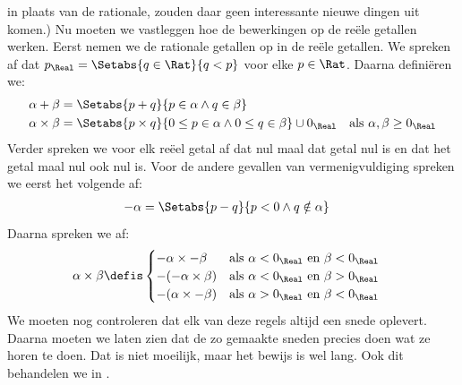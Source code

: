 \documentclass[openany]{memoir}
\begin{document}
in plaats van de rationale, zouden daar geen interessante nieuwe
dingen uit komen.)
Nu moeten we vastleggen hoe de bewerkingen op de reële getallen werken.
Eerst nemen we de rationale getallen op in de reële getallen. We
spreken af dat $p_\Real = \Setabs{q \in \Rat}{q < p}$ voor elke
$p \in \Rat$. Daarna definiëren we:
\begin{align*}
	\alpha + \beta &= \Setabs{p + q}{p \in \alpha \land q \in \beta}\\
	\alpha \times \beta &=
	\Setabs{p \times q}{0 \leq p \in \alpha \land 0 \leq q \in \beta} \cup 0_\Real & \text{als }\alpha, \beta \geq 0_\Real
\end{align*}
Verder spreken we voor elk reëel getal af dat nul maal dat getal nul
is en dat het getal maal nul ook nul is. Voor de andere gevallen van
vermenigvuldiging spreken we eerst het volgende af:
\begin{align*}
	-\alpha &= \Setabs{p - q}{p < 0 \land q \notin \alpha}
\end{align*}
Daarna spreken we af:
\begin{align*}
	\alpha \times \beta &\defis
	\begin{cases}
		\mathord{-}\alpha \times \mathord{-}\beta &\text{als }\alpha < 0_\Real\text{ en }\beta < 0_\Real\\
		\mathord{-}(\mathord{-}\alpha \times \beta) &\text{als }\alpha < 0_\Real \text{ en }\beta > 0_\Real\\
		\mathord{-}(\alpha \times \mathord{-}\beta) &\text{als }\alpha > 0_\Real \text{ en }\beta < 0_\Real
	\end{cases}
\end{align*}
We moeten nog controleren dat elk van deze regels altijd een snede
oplevert. Daarna moeten we laten zien dat de zo gemaakte sneden precies
doen wat ze horen te doen. Dat is niet moeilijk, maar het bewijs is wel
lang. Ook dit behandelen we in .
\endgroup

\begingroup
\def\olfilename{OLP-0046}
\def\olfilepath{content/sets-functions-relations/arithmetization/}
\hypertarget{unit-OLP-0046}{}
\end{document}
